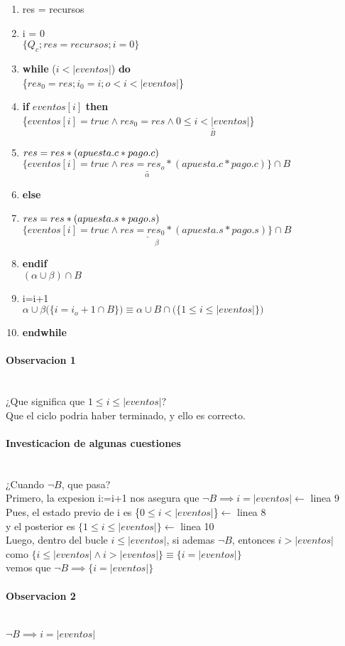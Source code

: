 \documentclass[../../document.tex]{subfiles}
\begin{document}
\begin{enumerate}
    \item res = recursos
    \item i = 0\\
    $\{Q_c; res=recursos; i=0\}$
    \item{\textbf{while} ($i<|eventos|$)\textbf{ do}\\
    \{$res_0=res;i_0=i;o<i<|eventos|$\}}
    \item \textbf{if} $eventos[i]$ \textbf{then}\\
    \{$eventos[i]=true\land res_0=res\land \underset{B }{\underline{0\leq i<|eventos|}}$\}
    \item $res=res*(apuesta.c*pago.c)\\$
    $\underset{\alpha}{\underline{\{eventos[i]=true\land res=res_o*(apuesta.c*pago.c)\}}}\cap B$
    \item \textbf{else}
    \item $res=res*(apuesta.s*pago.s)\\$
    $\underset{\beta}{\underline{\{eventos[i]=true\land res=res_0*(apuesta.s*pago.s)\}}\cap B}$
    \item\textbf{endif}
    \\$(\alpha \cup \beta)\cap B$
    \item  i=i+1
    \\$\alpha \cup \beta \bigl( \{i=i_o+1\cap B\} \bigr) \equiv \alpha \cup B \cap \bigl( \{1\leq i \leq |eventos| \} \bigr)$
    \item \textbf{endwhile}
\end{enumerate}
\paragraph*{Observacion 1}{\hfill\\¿Que significa que {\color{purple}$1\leq i \leq |eventos|$}?}
\\Que el ciclo podria haber terminado, y ello es correcto.
\paragraph*{Investicacion de algunas cuestiones}\hfill
\\¿Cuando $\lnot B$, que pasa?
\\Primero, la expesion i:=i+1 nos asegura que $\lnot B \implies i=|eventos|$\hfill{\color{BlueViolet}$\longleftarrow$ linea 9}
\\Pues, el estado previo de i es {\color{purple}\{$0\leq i < |eventos|$\}\hfill{\color{BlueViolet}$\longleftarrow$ linea 8}}
\\y el posterior es {\color{purple}$\{1\leq i \leq |eventos|\}$}\hfill{\color{BlueViolet}$\longleftarrow$ linea 10}
\\Luego, dentro del bucle $i\leq |eventos|$, si ademas $\lnot B$, entonces $i>|eventos|$
\\como $\{i\leq|eventos|\land i>|eventos|\}\equiv \{i=|eventos|\}$
\\
vemos que $\lnot B\implies \{i=|eventos|\}$
\paragraph*{Observacion 2}\hfill\\
$\lnot B\implies i=|eventos|$
\end{document}
